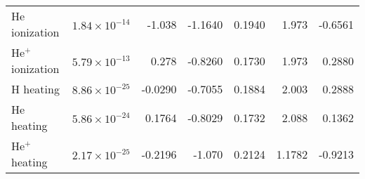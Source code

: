 \begin{table*}
\begin{center}
\begin{tabular*}{0.9\textwidth}{@{\extracolsep{\fill}}lrrrrrr}
He ionization &       $1.84 \times 10^{-14}$ & -1.038 & -1.1640 & 0.1940 & 1.973 & -0.6561 \\
He$^+$ ionization & $5.79 \times 10^{-13}$ & 0.278 & -0.8260 & 0.1730 & 1.973 & 0.2880 \\
H heating &            $8.86 \times 10^{-25}$ & -0.0290 & -0.7055 & 0.1884 & 2.003 & 0.2888 \\
He heating &         $5.86 \times 10^{-24}$ & 0.1764 & -0.8029 & 0.1732 & 2.088 & 0.1362 \\
He$^+$ heating &   $2.17 \times 10^{-25}$ & -0.2196 & -1.070 & 0.2124 & 1.1782 & -0.9213 \\
\end{tabular*}
\label{table:homo_coefs}
\end{center}
\end{table*}